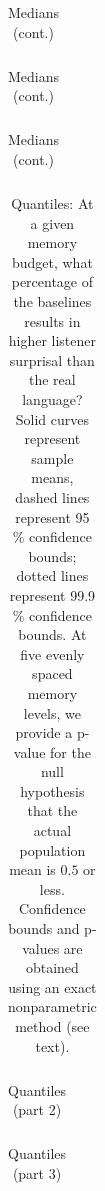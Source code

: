 \documentclass[11pt,letterpaper]{article}
\begin{document}
\begin{table}
\begin{longtable}{ccccccccccccccclll}

\end{longtable}
	\caption{Medians (cont.)}
\end{table}

\begin{table}
\begin{longtable}{ccccccccccccccclll}

\end{longtable}
	\caption{Medians (cont.)}
\end{table}

\begin{table}
\begin{longtable}{ccccccccccccccclll}

\end{longtable}
	\caption{Medians (cont.)}
\end{table}


\begin{table}
\begin{longtable}{cccccccccccccccccc}

\end{longtable}
	\caption{Quantiles: At a given memory budget, what percentage of the baselines results in higher listener surprisal than the real language? Solid curves represent sample means, dashed lines represent 95 \% confidence bounds; dotted lines represent 99.9 \% confidence bounds. At five evenly spaced memory levels, we provide a p-value for the null hypothesis that the actual population mean is $0.5$ or less. Confidence bounds and p-values are obtained using an exact nonparametric method (see text).}\label{tab:quantiles}
\end{table}

\begin{table}
\begin{longtable}{cccccccccccccccccc}

\end{longtable}
	\caption{Quantiles (part 2)}
\end{table}

\begin{table}
\begin{longtable}{cccccccccccccccccc}

\end{longtable}
	\caption{Quantiles (part 3)}
\end{table}
\end{document}
